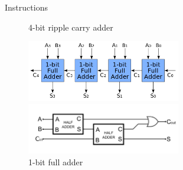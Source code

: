 \documentclass[xcolor=dvipsnames]{beamer}
\begin{document}
\begin{frame}{Instructions}
  \begin{figure}
    \centering
    \caption {4-bit ripple carry adder}
    \includegraphics[width=0.6\textwidth]{four_bit_adder}
    \vspace{5mm}
    \caption {1-bit full adder}
    \includegraphics[width=0.6\textwidth]{full_adder}
  \end{figure}
\end{frame}
\end{document}
